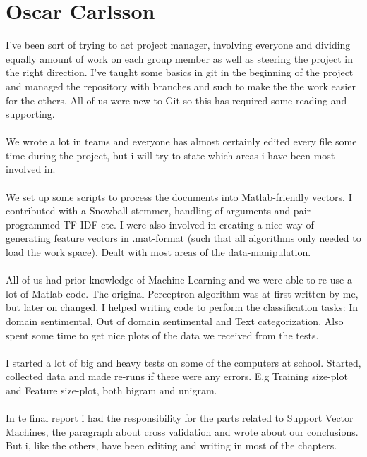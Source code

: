 \section*{Oscar Carlsson}
I've been sort of trying to act project manager, involving everyone and dividing equally amount of work on each group member as well as steering the project in the right direction. I've taught some basics in git in the beginning of the project and managed the repository with branches and such to make the the work easier for the others. All of us were new to Git so this has required some reading and supporting. \\\\
We wrote a lot in teams and everyone has almost certainly edited every file some time during the project, but i will try to state which areas i have been most involved in. \\\\
We set up some scripts to process the documents into Matlab-friendly vectors. I contributed with a Snowball-stemmer, handling of arguments and pair-programmed TF-IDF etc. I were also involved in creating a nice way of generating feature vectors in .mat-format (such that all algorithms only needed to load the work space). Dealt with most areas of the data-manipulation.\\\\
All of us had prior knowledge of Machine Learning and we were able to re-use a lot of Matlab code. The original Perceptron algorithm was at first written by me, but later on changed. I helped writing code to perform the classification tasks: In domain sentimental, Out of domain sentimental and Text categorization. Also spent some time to get nice plots of the data we received from the tests.\\\\
I started a lot of big and heavy tests on some of the computers at school. Started, collected data and made re-runs if there were any errors. E.g Training size-plot and Feature size-plot, both bigram and unigram.\\\\
In te final report i had the responsibility for the parts related to Support Vector Machines, the paragraph about cross validation and wrote about our conclusions. But i, like the others, have been editing and writing in most of the chapters.\\\\